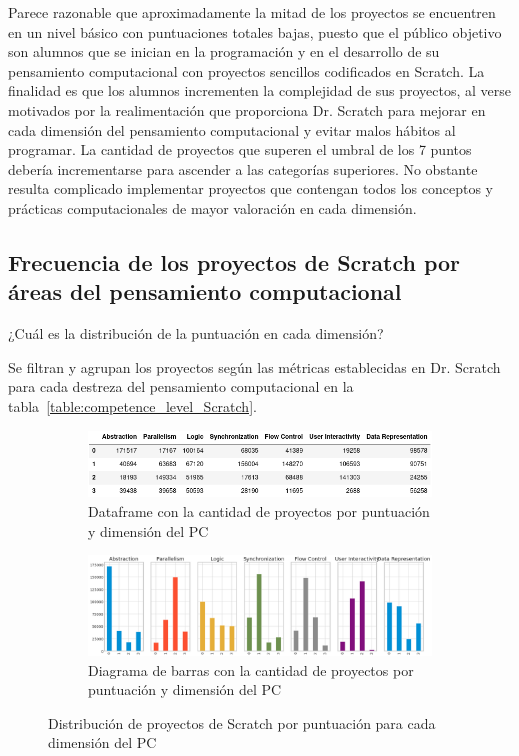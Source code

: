 \documentclass[a4paper, 12pt]{book}
\begin{document}
Parece razonable que aproximadamente la mitad de los proyectos se encuentren en un nivel básico con puntuaciones totales bajas, puesto que el público objetivo son alumnos que se inician en la programación y en el desarrollo de su pensamiento computacional con proyectos sencillos codificados en Scratch. La finalidad es que los alumnos incrementen la  complejidad de sus proyectos, al verse motivados por la realimentación que proporciona Dr. Scratch para mejorar en cada dimensión del pensamiento computacional y evitar malos hábitos al programar. La cantidad de proyectos que superen el umbral de los 7 puntos debería incrementarse para ascender a las categorías superiores. No obstante resulta complicado implementar proyectos que contengan todos los conceptos y prácticas computacionales de mayor valoración en cada dimensión.

\subsection{Frecuencia de los proyectos de Scratch por áreas del pensamiento computacional}
\label{subsec:frec_pc_Scratch}

¿Cuál es la distribución de la puntuación en cada dimensión?

Se filtran y agrupan los proyectos según las métricas establecidas en Dr. Scratch para cada destreza del pensamiento computacional en la tabla~\ref{table:competence_level_Scratch}.

\begin{figure}[H]
    \centering      
    \begin{subfigure}[h]{1\textwidth} 
        \includegraphics[width=\textwidth]{img/df_PC_Scratch.png}
        \caption{Dataframe con la cantidad de proyectos por puntuación y dimensión del PC}
        \label{fig:df_PC_Scratch}
    \end{subfigure}
    \begin{subfigure}[h]{1\textwidth} 
        \includegraphics[width=\textwidth]{img/distribution_PC.png}
        \caption{Diagrama de barras con la cantidad de proyectos por puntuación y dimensión del PC}
        \label{fig:barras_PC_Scratch}
    \end{subfigure} 
\caption{Distribución de proyectos de Scratch por puntuación para cada dimensión del PC}
\end{figure}
\end{document}
